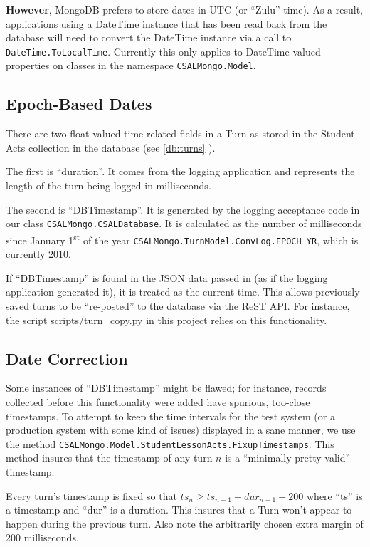 \documentclass[letterpaper,10pt]{article}
\newcommand{\fullxref}[1]{ \ref{#1} \nameref{#1} }
\begin{document}
\textbf{However}, MongoDB prefers to store dates in UTC (or ``Zulu'' time).
As a result, applications using a DateTime instance that has been read back
from the database will need to convert the DateTime instance via a call to 
\texttt{DateTime.ToLocalTime}. Currently this only applies to DateTime-valued
properties on classes in the namespace \texttt{CSALMongo.Model}.

\subsection{Epoch-Based Dates}

There are two float-valued time-related fields in a Turn as stored in the 
Student Acts collection in the database (see \fullxref{db:turns}).

The first is ``duration''.  It comes from the logging application and
represents the length of the turn being logged in milliseconds.

The second is ``DBTimestamp''.  It is generated by the logging acceptance code
in our class \texttt{CSALMongo.CSALDatabase}.  It is calculated as the number
of milliseconds since January 1\textsuperscript{st} of the year
\texttt{CSALMongo.TurnModel.ConvLog.EPOCH\_YR}, which is currently 2010.

If ``DBTimestamp'' is found in the JSON data passed in (as if the
logging application generated it), it is treated as the current time.  This
allows previously saved turns to be ``re-posted'' to the database via the ReST
API.  For instance, the script scripts/turn\_copy.py in this project relies
on this functionality.

\subsection{Date Correction}

Some instances of ``DBTimestamp'' might be flawed; for instance, records
collected before this functionality were added have spurious, too-close
timestamps.  To attempt to keep the time intervals for the test system
(or a production system with some kind of issues) displayed in a sane manner, 
we use the method \texttt{CSALMongo.Model.StudentLessonActs.FixupTimestamps}.
This method insures that the timestamp of any turn $n$ is a ``minimally pretty
valid'' timestamp.  

Every turn's timestamp is fixed so that
$ ts_{n} \geq ts_{n-1} + dur_{n-1} + 200 $ where ``ts'' is a timestamp and
``dur'' is a duration. This insures that a Turn won't appear to happen during
the previous turn.  Also note the arbitrarily chosen extra margin of 200
milliseconds.
\end{document}
